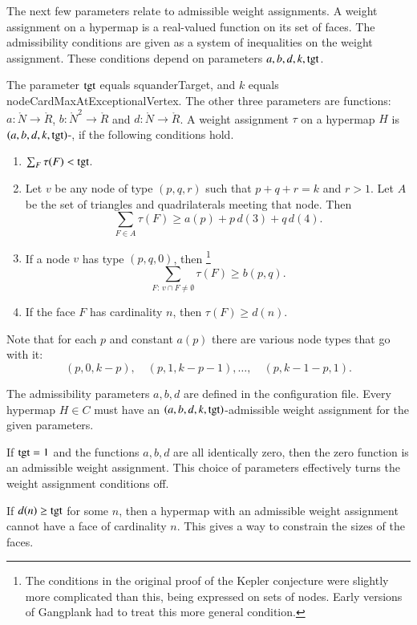 The next few parameters relate to admissible weight assignments.  A
weight assignment on a hypermap is a real-valued function on its set
of faces.  The admissibility conditions are given as a system of
inequalities on the weight assignment.  These conditions depend on parameters
$a,b,d,k,{\operatorname{tgt}}$.

The parameter ${\operatorname{tgt}}$ equals squanderTarget, and $k$ equals 
nodeCardMaxAtExceptionalVertex.  The other three parameters are functions:
$a:\ring{N}\to\ring{R}$, $b:\ring{N}^2\to \ring{R}$ and $d:\ring{N}\to\ring{R}$.
A weight assignment $\tau$ on a hypermap $H$
is $(a,b,d,k,{\operatorname{tgt}})$-, if the following
conditions hold.
\begin{enumerate}
\item {} $\sum_F \tau(F) < {\operatorname{tgt}}$.
\item {} 
Let $v$ be any node of type $(p,q,r)$ such that $p+q+r=k$ and $r>1$. Let
  $A$ be the set of triangles and quadrilaterals meeting that node.  Then
\[ \sum_{F\in A} \tau(F)
\ge  a(p) + p\, d(3) + q\, d(4).\] 
\item {}
 If a node $v$ has type $(p,q,0)$, then%
\footnote{The conditions in the original proof of the Kepler conjecture were slightly
more complicated than this, being expressed on  sets of nodes.  Early versions of Gangplank had to treat this more general condition.}
  \[ \sum_{F:\,v\cap F\ne\emptyset} \tau(F) \ge
    b(p,q).\] 
\item {}
 If the face $F$ has cardinality $n$, then
$\tau(F) \ge d(n)$.
\end{enumerate}
Note that for each $p$ and constant $a(p)$ there are various node types that go with it:
\[
(p,0,k-p),\quad (p,1,k-p-1),\ldots,\quad (p,k-1-p,1).
\]


The admissibility parameters $a,b,d$ are defined in the configuration
file.  Every hypermap $H\in C$ must have an
$(a,b,d,k,{\operatorname{tgt}})$-admissible weight assignment for the
given parameters.

\begin{example}  If ${\operatorname{tgt}}=1$ and the functions $a,b,d$ are all identically zero,
then the zero function is an admissible weight assignment.  This choice of parameters
effectively 
turns the weight assignment conditions off.
\end{example}

\begin{example} If  $d(n)\ge{\operatorname{tgt}}$ for some $n$, then a hypermap with
an admissible weight assignment cannot have a face of cardinality $n$.  This gives
a way to constrain the sizes of the faces.
\end{example}

